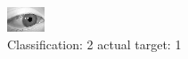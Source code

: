 \begin{figure}[h!]
\begin{center}
\includegraphics[width=0.60\columnwidth]{figures/ID2771_class_2_target_1.png}
\end{center}
\caption{ Classification: 2 actual target: 1}
\label{fig:ID2771_class_2_target_1}
\end{figure}
